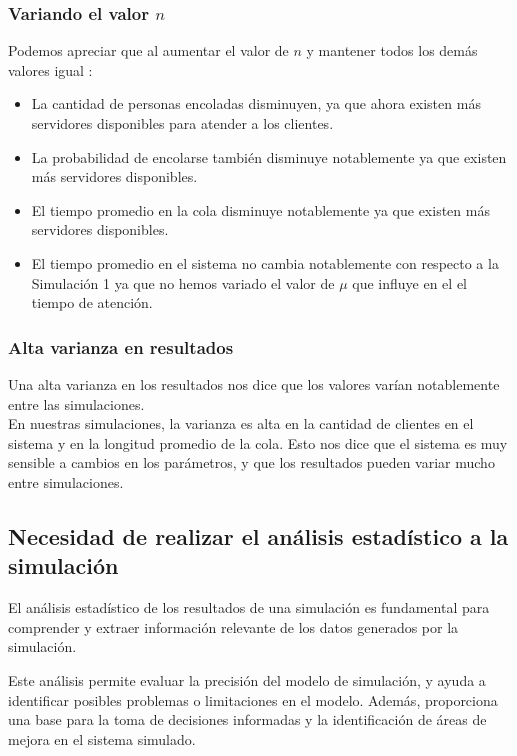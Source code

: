 \documentclass[11pt]{article}
\begin{document}
    \subsubsection{Variando el valor $n$}
    Podemos apreciar que al aumentar el valor de $n$ y mantener todos los demás valores igual :
     \begin{itemize}
        \item La cantidad de personas encoladas disminuyen, ya que ahora existen más servidores disponibles para atender a los clientes.
        \item La probabilidad de encolarse también disminuye notablemente ya que existen más servidores disponibles.
         \item El tiempo promedio en la cola disminuye notablemente ya que existen más servidores disponibles.
         \item El tiempo promedio en el sistema no cambia notablemente con respecto a la Simulación 1 ya que no hemos variado el valor de $\mu$ que influye en el el tiempo de atención.
    \end{itemize}

    \subsubsection{Alta varianza en resultados}
    Una alta varianza en los resultados nos dice que los valores varían notablemente entre las simulaciones.\\
    En nuestras simulaciones, la varianza es alta en la cantidad de clientes en el sistema y en la longitud promedio de la cola. 
    Esto nos dice que el sistema es muy sensible a cambios en los parámetros, y que los resultados pueden variar mucho entre simulaciones.\\


    \subsection{Necesidad de realizar el análisis estadístico a la simulación}
    El análisis estadístico de los resultados de una simulación es fundamental para comprender y extraer información
    relevante de los datos generados por la simulación.

    Este análisis permite evaluar la precisión del modelo de simulación, y ayuda
    a identificar posibles problemas o limitaciones en el modelo. Además, proporciona una base para
    la toma de decisiones informadas y la identificación de áreas de mejora en el sistema simulado.
\end{document}
